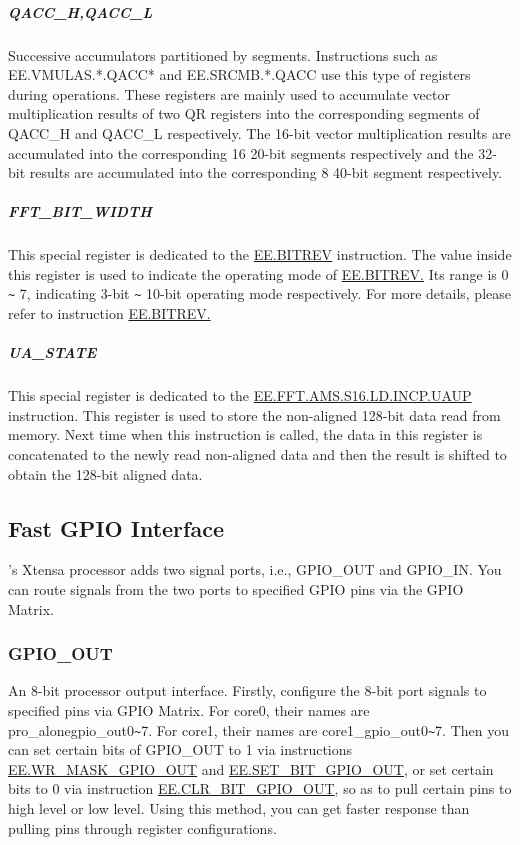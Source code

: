 \documentclass[main\_\_EN.tex]{subfiles}
\begin{document}
\subparagraph{QACC\_H,QACC\_L}

Successive accumulators partitioned by segments. Instructions such as EE.VMULAS.*.QACC* and EE.SRCMB.*.QACC use this type of registers during operations. These registers are mainly used to accumulate vector multiplication results of two QR registers into the corresponding segments of QACC\_H and QACC\_L respectively. The 16-bit vector multiplication results are accumulated into the corresponding 16 20-bit segments respectively and the 32-bit results are accumulated into the corresponding 8 40-bit segment respectively.

\subparagraph{FFT\_BIT\_WIDTH}

This special register is dedicated to the \hyperref[instruction:EEBITREV]{EE.BITREV} instruction. The value inside this register is used to indicate the operating mode of \hyperref[instruction:EEBITREV]{EE.BITREV.} Its range is 0 \verb+~+ 7, indicating 3-bit \verb+~+ 10-bit operating mode respectively. For more details, please refer to instruction \hyperref[instruction:EEBITREV]{EE.BITREV.}

\subparagraph{UA\_STATE}

This special register is dedicated to the \hyperref[instruction:EEFFTAMSS16LDINCPUAUP]{EE.FFT.AMS.S16.LD.INCP.UAUP} instruction. This register is used to store the non-aligned 128-bit data read from memory. Next time when this instruction is called, the data in this register is concatenated to the newly read non-aligned data and then the result is shifted to obtain the 128-bit aligned data.

\subsection{Fast GPIO Interface}

\chipname{}'s Xtensa processor adds two signal ports, i.e., GPIO\_OUT and GPIO\_IN. You can route signals from the two ports to specified GPIO pins via the GPIO Matrix.

\subsubsection{GPIO\_OUT}

An 8-bit processor output interface. Firstly, configure the 8-bit port signals to specified pins via GPIO Matrix. For core0, their names are pro\_alonegpio\_out0\verb+~+7. For core1, their names are core1\_gpio\_out0\verb+~+7. Then you can set certain bits of GPIO\_OUT to 1 via instructions \hyperref[instruction:EEWRMASKGPIOOUT]{EE.WR\_MASK\_GPIO\_OUT} and \hyperref[instruction:EESETBITGPIOOUT]{EE.SET\_BIT\_GPIO\_OUT}, or set certain bits to 0 via instruction \hyperref[instruction:EECLRBITGPIOOUT]{EE.CLR\_BIT\_GPIO\_OUT}, so as to pull certain pins to high level or low level. Using this method, you can get faster response than pulling pins through register configurations.
\end{document}
